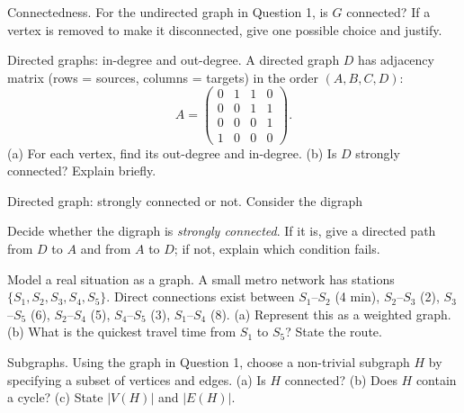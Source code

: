 \documentclass[11pt]{article}
\def\textbf#1{#1}%
\newcounter{question}
\begin{document}
\begin{question}
\textbf{Connectedness.}
For the undirected graph in Question 1, is $G$ connected? If a vertex is removed to make it disconnected, give one possible choice and justify.
\end{question}

\begin{question}
\textbf{Directed graphs: in-degree and out-degree.}
A directed graph $D$ has adjacency matrix (rows = sources, columns = targets) in the order $(A,B,C,D)$:
\[
A=\begin{pmatrix}
0&1&1&0\\
0&0&1&1\\
0&0&0&1\\
1&0&0&0
\end{pmatrix}.
\]
(a) For each vertex, find its out-degree and in-degree.  
(b) Is $D$ strongly connected? Explain briefly.
\end{question}

\begin{question}
\textbf{Directed graph: strongly connected or not.}
Consider the digraph
\begin{center}
\end{center}
Decide whether the digraph is \emph{strongly connected}. If it is, give a directed path from $D$ to $A$ and from $A$ to $D$; if not, explain which condition fails.
\end{question}

\begin{question}
\textbf{Model a real situation as a graph.}
A small metro network has stations $\{S_1,S_2,S_3,S_4,S_5\}$. Direct connections exist between  
$S_1$–$S_2$ (4 min), $S_2$–$S_3$ (2), $S_3$–$S_5$ (6), $S_2$–$S_4$ (5), $S_4$–$S_5$ (3), $S_1$–$S_4$ (8).  
(a) Represent this as a weighted graph.  
(b) What is the quickest travel time from $S_1$ to $S_5$? State the route.
\end{question}

\begin{question}
\textbf{Subgraphs.}
Using the graph in Question 1, choose a non-trivial subgraph $H$ by specifying a subset of vertices and edges.  
(a) Is $H$ connected? (b) Does $H$ contain a cycle? (c) State $|V(H)|$ and $|E(H)|$.
\end{question}
\end{document}
